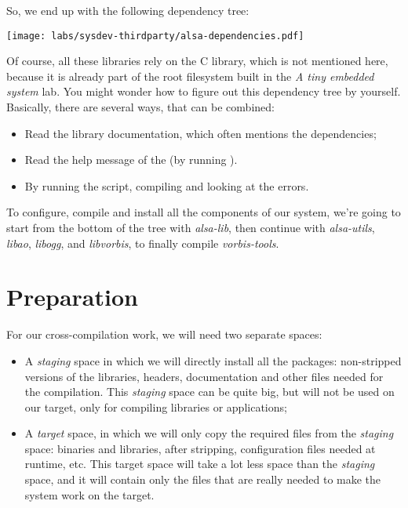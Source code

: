 So, we end up with the following dependency tree:

\begin{center}
\texttt{[image: labs/sysdev-thirdparty/alsa-dependencies.pdf]}
\end{center}

Of course, all these libraries rely on the C library, which is not
mentioned here, because it is already part of the root filesystem
built in the {\em A tiny embedded system} lab. You might wonder how to
figure out this dependency tree by yourself. Basically, there are
several ways, that can be combined:

\begin{itemize}
\item Read the library documentation, which often mentions the
  dependencies;
\item Read the help message of the  (by running
  ).
\item By running the  script, compiling and looking
  at the errors.
\end{itemize}

To configure, compile and install all the components of our system,
we're going to start from the bottom of the tree with {\em alsa-lib},
then continue with {\em alsa-utils}, \emph{libao}, {\em libogg},
and \emph{libvorbis}, to finally compile \emph{vorbis-tools}.

\section{Preparation}

For our cross-compilation work, we will need two separate spaces:
\begin{itemize}
\item A \emph{staging} space in which we will directly install all the
  packages: non-stripped versions of the libraries, headers,
  documentation and other files needed for the compilation. This
  \emph{staging} space can be quite big, but will not be used on our
  target, only for compiling libraries or applications;
\item A \emph{target} space, in which we will only copy the required
  files from the \emph{staging} space: binaries and libraries, after
  stripping, configuration files needed at runtime, etc. This target
  space will take a lot less space than the \emph{staging} space, and
  it will contain only the files that are really needed to make the
  system work on the target.
\end{itemize}

